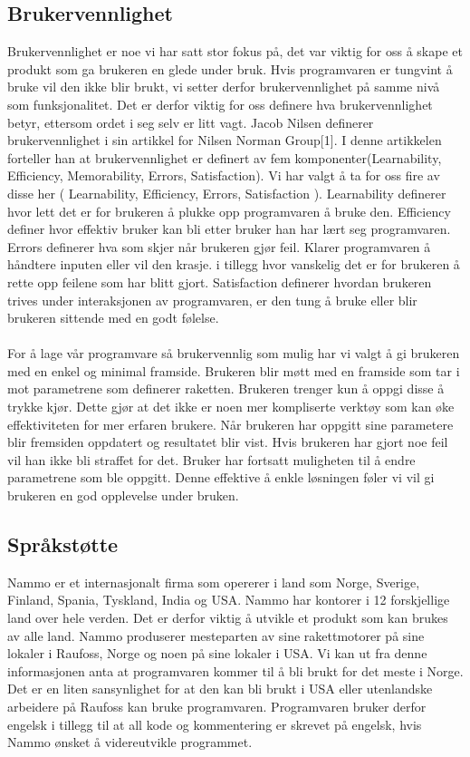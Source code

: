 \subsection{Brukervennlighet}
Brukervennlighet er noe vi har satt stor fokus på, det var viktig for oss å skape et produkt som ga brukeren en glede under bruk. Hvis programvaren er tungvint å bruke vil den ikke blir brukt, vi setter derfor brukervennlighet på samme nivå som funksjonalitet. Det er derfor viktig for oss definere hva brukervennlighet betyr, ettersom ordet i seg selv er litt vagt. Jacob Nilsen definerer brukervennlighet i sin artikkel for Nilsen Norman Group[1]. I denne artikkelen forteller han at brukervennlighet er definert av fem komponenter(Learnability, Efficiency, Memorability, Errors, Satisfaction). Vi har valgt å ta for oss fire av disse her ( Learnability, Efficiency, Errors, Satisfaction ). Learnability definerer hvor lett det er for brukeren å plukke opp programvaren å bruke den. Efficiency definer hvor effektiv bruker kan bli etter bruker han har lært seg programvaren. Errors definerer hva som skjer når brukeren gjør feil. Klarer programvaren å håndtere inputen eller vil den krasje. i tillegg hvor vanskelig det er for brukeren å rette opp feilene som har blitt gjort. Satisfaction definerer hvordan brukeren trives under interaksjonen av programvaren, er den tung å bruke eller blir brukeren sittende med en godt følelse. \\ \\
For å lage vår programvare så brukervennlig som mulig har vi valgt å gi brukeren med en enkel og minimal framside. Brukeren blir møtt med en framside som tar i mot parametrene som definerer raketten. Brukeren trenger kun å oppgi disse å trykke kjør. Dette gjør at det ikke er noen mer kompliserte verktøy som kan øke effektiviteten for mer erfaren brukere. Når brukeren har oppgitt sine parametere blir fremsiden oppdatert og resultatet blir vist. Hvis brukeren har gjort noe feil vil han ikke bli straffet for det. Bruker har fortsatt muligheten til å endre parametrene som ble oppgitt. Denne effektive å enkle løsningen føler vi vil gi brukeren en god opplevelse under bruken.



\subsection{Språkstøtte}
Nammo er et internasjonalt firma som opererer i land som Norge, Sverige, Finland, Spania, Tyskland, India og USA. Nammo har kontorer i 12 forskjellige land over hele verden. Det er derfor viktig å utvikle et produkt som kan brukes av alle land. Nammo produserer mesteparten av sine rakettmotorer på sine lokaler i Raufoss, Norge og noen på sine lokaler i USA. Vi kan ut fra denne informasjonen anta at programvaren kommer til å bli brukt for det meste i Norge. Det er en liten sansynlighet for at den kan bli brukt i USA eller utenlandske arbeidere på Raufoss kan bruke programvaren. Programvaren bruker derfor engelsk i tillegg til at all kode og kommentering er skrevet på engelsk, hvis Nammo ønsket å videreutvikle programmet.

